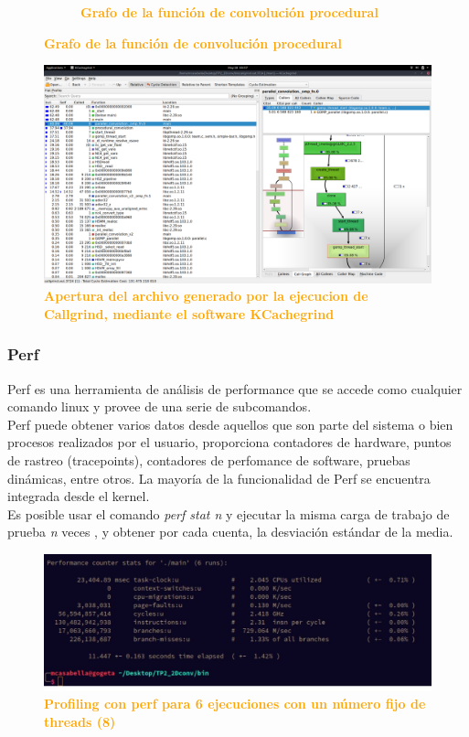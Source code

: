 \documentclass{article}
\begin{document}
\begin{figure}[H]
\begin{subfigure}[b]{0.43\textwidth}
     \caption{\textbf{\textcolor{Orange}{Grafo de la función de convolución procedural}}}
    \label{fig:42}
  \end{subfigure}
\end{figure}

\begin{figure}[H]
    \centering
      \includegraphics[width=1.0\textwidth]{figures/interfaz.png}
       \centering
       \caption{\textbf{\textcolor{Orange}{Apertura del archivo generado por la ejecucion de Callgrind, mediante el software KCachegrind}}}
    \end{figure}
\clearpage
\subsubsection{Perf}
Perf es una herramienta de análisis de performance que se accede como cualquier comando linux y provee de una serie de subcomandos.\\

Perf puede obtener varios datos desde aquellos que son parte del sistema o bien procesos realizados por el usuario, proporciona contadores de hardware, puntos de rastreo (tracepoints), contadores de perfomance de software, pruebas dinámicas, entre otros. La mayoría de la funcionalidad de Perf se encuentra integrada desde el kernel.\\

Es posible usar el comando \textit{perf stat n} y ejecutar la misma carga de trabajo de prueba \textit{n} veces , y obtener por cada cuenta, la desviación estándar de la media.
\begin{figure}[H]
    \centering
      \includegraphics[width=1.0\textwidth]{figures/perf.jpg}
       \centering
       \caption{\textbf{\textcolor{Orange}{Profiling con perf para 6 ejecuciones con un número fijo de threads (8)}}}
    \end{figure}
\end{document}
